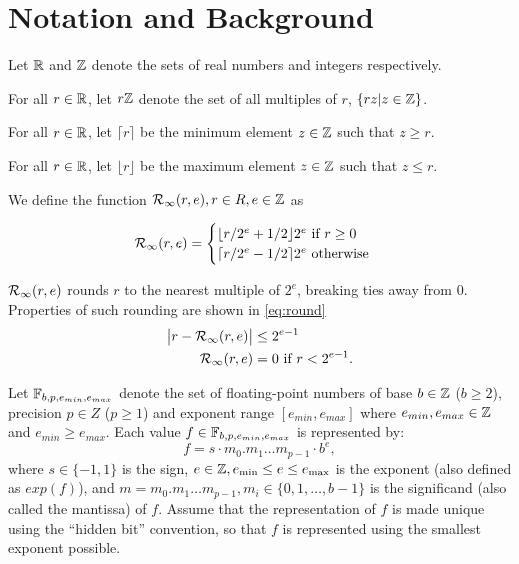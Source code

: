 \section{Notation and Background}
  \label{sec:notation}
  Let $\mathbb{R}$ and $\mathbb{Z}$ denote the sets of real numbers and integers respectively.

  For all $r \in \mathbb{R}$, let $r\mathbb{Z}$ denote the set of all multiples of $r$,
  $\{rz | z \in \mathbb{Z}\}$.

  For all $r \in \mathbb{R}$, let $\lceil r \rceil$ be the minimum element $z \in \mathbb{Z}$
  such that $z \geq r$.

  For all $r \in \mathbb{R}$, let $\lfloor r \rfloor$ be the maximum element $z \in \mathbb{Z}$
  such that $z \leq r$.

  We define the function $\mathcal{R}_\text{$\infty$}(r, e), r \in R, e \in \mathbb{Z}$ as

  \begin{equation}
    \mathcal{R}_\text{$\infty$}(r, e) = \begin{cases}
        \lfloor r/2^e + 1/2 \rfloor 2^e \text{ if } r \geq 0\\
        \lceil r/2^e - 1/2 \rceil 2^e \text{ otherwise}
    \end{cases}
  \end{equation}

  $\mathcal{R}_\text{$\infty$}(r, e)$ rounds $r$ to the nearest multiple of $2^e$,
  breaking ties away from 0. Properties of such rounding are shown in
  \eqref{eq:round}
  \begin{equation}
    \begin{aligned}
    \bigl|r - \mathcal{R}_\text{$\infty$}(r, e)\bigr| & \leq 2^{e - 1} \\
    \mathcal{R}_\text{$\infty$}(r,e) & = 0 \text{ if } r < 2^{e-1}.
    \end{aligned}
    \label{eq:round}
  \end{equation}

  Let $\mathbb{F}_{b,p,e_{min},e_{max}}$ denote the set of floating-point numbers
  of base $b \in \mathbb{Z}$ ($b \geq 2$),
  precision $p \in Z$ ($p \geq 1$) and exponent range $[e_{min}, e_{max}]$
  where $e_{min}, e_{max} \in \mathbb{Z}$ and $e_{min} \geq e_{max}$.
  Each value $f \in \mathbb{F}_{b,p,e_{min},e_{max}}$ is represented by:
  \[
    f = s \cdot m_0.m_1 \ldots m_{p-1} \cdot b^e,
  \]
  where $s \in \{-1,1 \}$ is the sign,
  $e \in \mathbb{Z}, e_{\text{min}} \leq e \leq e_{\text{max}}$ is the exponent
  (also defined as $exp(f)$),
  and $m = m_0.m_1 \ldots m_{p-1}, m_i \in \{ 0, 1, \ldots, b-1 \}$
  is the significand (also called the mantissa) of $f$. Assume that the
  representation of $f$ is made unique using the ``hidden bit'' convention, so
  that $f$ is represented using the smallest exponent possible.


